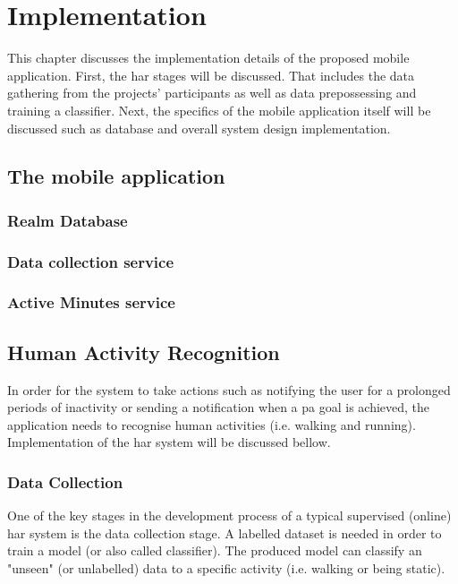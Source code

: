 \chapter{Implementation}
This chapter discusses the implementation details of the proposed mobile application. First, the \gls{har} stages will be discussed. That includes the data gathering from the projects' participants as well as data prepossessing and training a classifier. Next, the specifics of the mobile application itself will be discussed such as database and overall system design implementation.

\section{The mobile application}
          
    
    \subsection{Realm Database}
    
    \subsection{Data collection service}
    
    \subsection{Active Minutes service}
    


\section{Human Activity Recognition}
In order for the system to take actions such as notifying the user for a prolonged periods of inactivity or sending a notification when a \gls{pa} goal is achieved, the application needs to recognise human activities (i.e. walking and running). Implementation of the \gls{har} system will be discussed bellow.

    \subsection{Data Collection}
    One of the key stages in the development process of a typical supervised (online) \gls{har} system is the data collection stage. A labelled dataset is needed in order to train a model (or also called classifier). The produced model can classify an "unseen" (or unlabelled) data to a specific activity (i.e. walking or being static).
    
